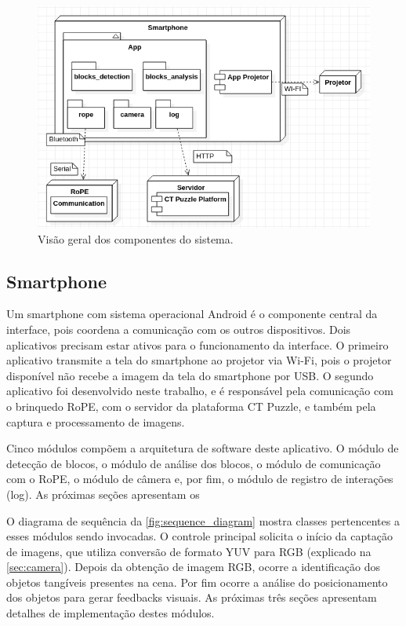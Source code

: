 \begin{figure}
    \centering
    \includegraphics[width=.8\linewidth,fbox]{figs/system_overview.png}
    \caption{Visão geral dos componentes do sistema.}
    \label{fig:system_overview}
\end{figure}

\subsection{Smartphone}
Um smartphone com sistema operacional Android é o componente central da interface, pois coordena a comunicação com os outros dispositivos. Dois aplicativos precisam estar ativos para o funcionamento da interface. O primeiro aplicativo transmite a tela do smartphone ao projetor via Wi-Fi, pois o projetor disponível não recebe a imagem da tela do smartphone por USB. O segundo aplicativo foi desenvolvido neste trabalho, e é responsável pela comunicação com o brinquedo RoPE, com o servidor da plataforma CT Puzzle, e também pela captura e processamento de imagens.

Cinco módulos compõem a arquitetura de software deste aplicativo. O módulo de detecção de blocos, o módulo de análise dos blocos, o módulo de comunicação com o RoPE, o módulo de câmera e, por fim, o módulo de registro de interações (log). As próximas seções apresentam os 


O diagrama de sequência da \autoref{fig:sequence_diagram} mostra classes pertencentes a esses módulos sendo invocadas. O controle principal solicita o início da captação de imagens, que utiliza conversão de formato YUV para RGB (explicado na \autoref{sec:camera}). Depois da obtenção de imagem RGB, ocorre a identificação dos objetos tangíveis presentes na cena. Por fim ocorre a análise do posicionamento dos objetos para gerar feedbacks visuais. As próximas três seções apresentam detalhes de implementação destes módulos.

